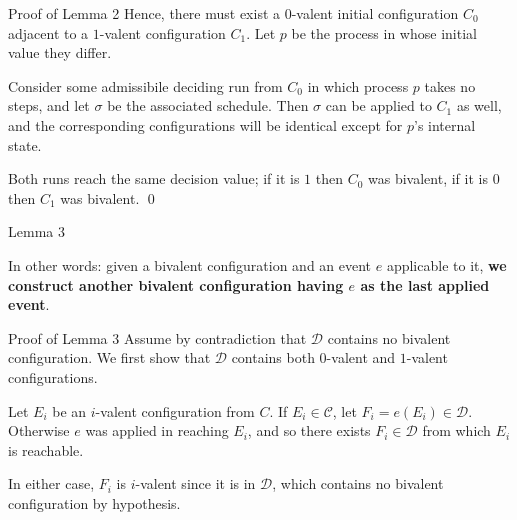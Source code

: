 \documentclass[12pt]{beamer}
\begin{document}
  \begin{frame}{Proof of Lemma 2}
    Hence, there must exist a \(0\)-valent initial configuration \(C_0\)
    adjacent to a \(1\)-valent configuration \(C_1\). Let \(p\) be the process
    in whose initial value they differ.

    \vspace{0.25cm}

    Consider some admissibile deciding run from \(C_0\) in which process \(p\)
    takes no steps, and let \(\sigma\) be the associated schedule. Then
    \(\sigma\) can be applied to \(C_1\) as well, and the corresponding
    configurations will be identical except for \(p\)'s internal state.

    \vspace{0.25cm}

    Both runs reach the same decision value; if it is \(1\) then \(C_0\) was
    bivalent, if it is \(0\) then \(C_1\) was bivalent. \qed
  \end{frame}

  \begin{frame}{Lemma 3}

    \vspace{0.25cm}

    In other words: given a bivalent configuration and an event \(e\)
    applicable to it, \textbf{we construct another bivalent configuration
    having \(e\) as the last applied event}.
  \end{frame}

  \begin{frame}{Proof of Lemma 3}
    Assume by contradiction that \(\mathcal{D}\) contains no bivalent
    configuration. We first show that \(\mathcal{D}\) contains both
    \(0\)-valent and \(1\)-valent configurations.

    \vspace{0.25cm}

    Let \(E_i\) be an \(i\)-valent configuration from \(C\). If \(E_i\in
    \mathcal{C}\), let \(F_i = e(E_i) \in \mathcal{D}\). Otherwise \(e\) was
    applied in reaching \(E_i\), and so there exists \(F_i \in \mathcal{D}\)
    from which \(E_i\) is reachable.

    \vspace{0.25cm}

    In either case, \(F_i\) is \(i\)-valent since it is in \(\mathcal{D}\),
    which contains no bivalent configuration by hypothesis.
  \end{frame}
\end{document}
